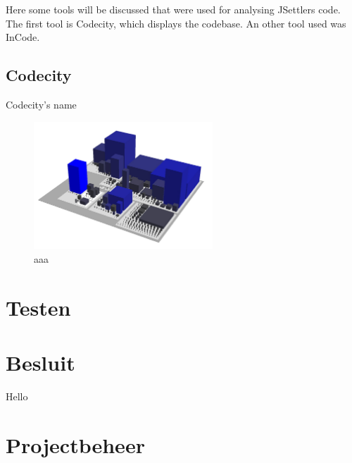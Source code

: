 \documentclass[pdftex12pt, a4paper]{article}
\begin{document}
Here some tools will be discussed that were used for analysing JSettlers code. The first tool is Codecity, which displays the codebase. An other tool used was InCode.

\subsection{Codecity}

Codecity's name 

\begin{figure}
\begin{center}
\includegraphics[width=0.6\textwidth]{Image/Codecity/Codecity1.jpg}
\caption{aaa}
\label{fig:codecity1}
\end{center}
\end{figure}

\newpage

\section{Testen}

\newpage

\section{Besluit}

Hello 


\newpage

\section{Projectbeheer}
\end{document}

